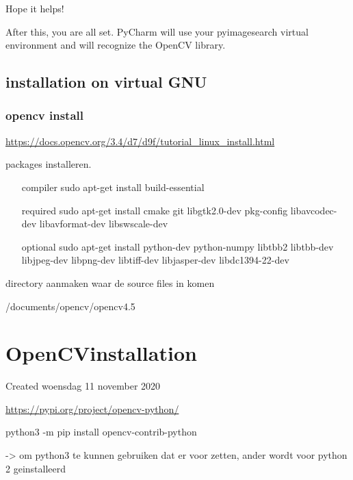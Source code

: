 \documentclass{article}
\begin{document}
Hope it helps!



After this, you are all set. PyCharm will use your pyimagesearch virtual environment and will recognize the OpenCV library.



\subsection{installation on virtual GNU}



\subsubsection{opencv install}

\href{https://docs.opencv.org/3.4/d7/d9f/tutorial_linux_install.html}{https://docs.opencv.org/3.4/d7/d9f/tutorial\_linux\_install.html}



packages installeren. 

\begin{enumerate}[1]
\item [compiler] sudo apt-get install build-essential
\item [required] sudo apt-get install cmake git libgtk2.0-dev pkg-config libavcodec-dev libavformat-dev libswscale-dev
\item [optional] sudo apt-get install python-dev python-numpy libtbb2 libtbb-dev libjpeg-dev libpng-dev libtiff-dev libjasper-dev libdc1394-22-dev
\end{enumerate}
directory aanmaken waar de source files in komen

/documents/opencv/opencv4.5


		\section{OpenCVinstallation}

Created woensdag 11 november 2020



\href{https://pypi.org/project/opencv-python/}{https://pypi.org/project/opencv-python/}



python3 -m pip install opencv-contrib-python



-\textgreater{} om python3 te kunnen gebruiken dat er voor zetten, ander wordt voor python 2 geinstalleerd
\end{document}
